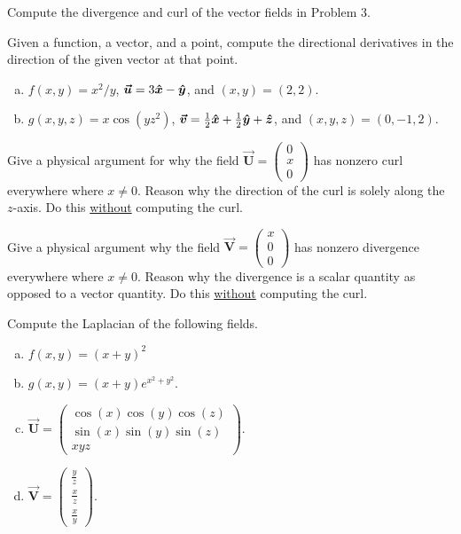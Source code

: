 \documentclass[12pt]{article} %
\newcommand{\vecfieldV}{\boldsymbol{\vec{V}}}
\newcommand{\vecfieldU}{\boldsymbol{\vec{U}}}
\begin{document}
\begin{problem}
Compute the divergence and curl of the vector fields in Problem 3.
\end{problem}

\begin{problem}
Given a function, a vector, and a point, compute the directional derivatives in the direction of the given vector at that point.
\begin{enumerate}[(a)]
    \item $f(x,y)=x^2/y$, $\boldsymbol{\boldsymbol{\vec{u}}} = 3\boldsymbol{\hat{x}} -\boldsymbol{\hat{y}}$, and $(x,y)=(2,2)$.
    \item $g(x,y,z)=x\cos(yz^2)$, $\boldsymbol{\boldsymbol{\vec{v}}} = \frac{1}{2}\boldsymbol{\hat{x}} + \frac{1}{2} \boldsymbol{\hat{y}} + \boldsymbol{\hat{z}}$, and $(x,y,z)=(0,-1,2)$.
\end{enumerate}
\end{problem}

\begin{problem}
    Give a physical argument for why the field $\vecfieldU = \begin{pmatrix} 0 \\ x \\ 0 \end{pmatrix}$ has nonzero curl everywhere where $x\neq 0$. Reason why the direction of the curl is solely along the $z$-axis.  Do this \underline{without} computing the curl.
\end{problem}

\begin{problem}
    Give a physical argument why the field $\vecfieldV = \begin{pmatrix} x \\ 0 \\ 0 \end{pmatrix}$ has nonzero divergence everywhere where $x\neq 0$. Reason why the divergence is a scalar quantity as opposed to a vector quantity. Do this \underline{without} computing the curl.
\end{problem}

\begin{problem}
Compute the Laplacian of the following fields.
\begin{multicols}{2}
\begin{enumerate}[(a)]
    \item $f(x,y) = (x+y)^2$
    \item $g(x,y) = (x+y)e^{x^2+y^2}$.
    \item $\vecfieldU = \begin{pmatrix} \cos(x)\cos(y)\cos(z) \\ \sin(x)\sin(y)\sin(z) \\ xyz \end{pmatrix}$.
    \item $\vecfieldV = \begin{pmatrix} \frac{y}{z} \\ \frac{x}{z} \\ \frac{x}{y} \end{pmatrix}$.
\end{enumerate}
\end{multicols}
\end{problem}
\end{document}
